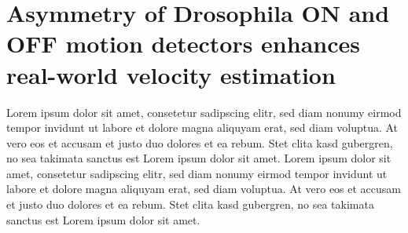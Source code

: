 \section{Asymmetry of Drosophila ON and OFF motion detectors enhances real-world velocity estimation}
\label{sct:manuscript_leonhardt}

Lorem ipsum dolor sit amet, consetetur sadipscing elitr, sed diam nonumy eirmod tempor invidunt ut labore et dolore magna aliquyam erat, sed diam voluptua. At vero eos et accusam et justo duo dolores et ea rebum. Stet clita kasd gubergren, no sea takimata sanctus est Lorem ipsum dolor sit amet. Lorem ipsum dolor sit amet, consetetur sadipscing elitr, sed diam nonumy eirmod tempor invidunt ut labore et dolore magna aliquyam erat, sed diam voluptua. At vero eos et accusam et justo duo dolores et ea rebum. Stet clita kasd gubergren, no sea takimata sanctus est Lorem ipsum dolor sit amet.

\newpage

